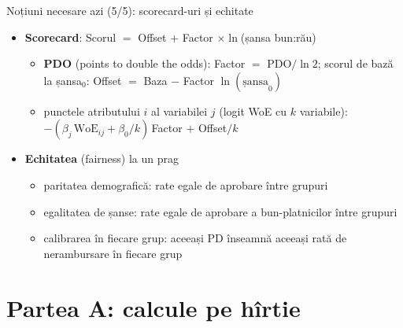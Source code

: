 \begin{frame}{Noțiuni necesare azi (5/5): scorecard-uri și echitate}
\itemsize{\small}
\begin{itemize}
    \item \textbf{Scorecard}: Scorul $=$ Offset $+$ Factor $\times \ln$(șansa bun:rău) 
    \begin{itemize}
        \item \textbf{PDO} (points to double the odds): Factor $=$ PDO$/\ln 2$; scorul de bază la șansa$_0$: Offset $=$ Baza $-$ Factor $\ln(\text{șansa}_0)$
        \item punctele atributului $i$ al variabilei $j$ (logit WoE cu $k$ variabile): $-(\beta_j\,\mathrm{WoE}_{ij} + \beta_0/k)\,$Factor $+$ Offset$/k$
    \end{itemize}
    \item \textbf{Echitatea} (fairness) la un prag 
    \begin{itemize}
        \item paritatea demografică: rate egale de aprobare între grupuri
        \item egalitatea de șanse: rate egale de aprobare a bun-platnicilor între grupuri
        \item calibrarea în fiecare grup: aceeași PD înseamnă aceeași rată de nerambursare în fiecare grup
    \end{itemize}
\end{itemize}
\end{frame}


\section{Partea A: calcule pe hîrtie}

